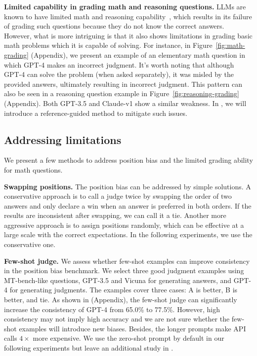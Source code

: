 \textbf{Limited capability in grading math and reasoning questions.}
LLMs are known to have limited math and reasoning capability~\cite{cobbe2021training}, which results in its failure of grading such questions because they do not know the correct answers.
However, what is more intriguing is that it also shows limitations in grading basic math problems which it is capable of solving.
For instance, in Figure~\ref{fig:math-grading} (Appendix), we present an example of an elementary math question in which GPT-4 makes an incorrect judgment.
It's worth noting that although GPT-4 can solve the problem (when asked separately), it was misled by the provided answers, ultimately resulting in incorrect judgment.
This pattern can also be seen in a reasoning question example in Figure~\ref{fig:reasoning-grading} (Appendix).
Both GPT-3.5 and Claude-v1 show a similar weakness.
In , we will introduce a reference-guided method to mitigate such issues.

\subsection{Addressing limitations}
\label{sec:addressing_limitations}
We present a few methods to address position bias and the limited grading ability for math questions.


\textbf{Swapping positions.}
The position bias can be addressed by simple solutions.
A conservative approach is to call a judge twice by swapping the order of two answers and only declare a win when an answer is preferred in both orders. If the results are inconsistent after swapping, we can call it a tie.
Another more aggressive approach is to assign positions randomly, which can be effective at a large scale with the correct expectations. In the following experiments, we use the conservative one.


\textbf{Few-shot judge.}
We assess whether few-shot examples can improve consistency in the position bias benchmark. We select three good judgment examples using MT-bench-like questions, GPT-3.5 and Vicuna for generating answers, and GPT-4 for generating judgments. 
The examples cover three cases: A is better, B is better, and tie.
As shown in  (Appendix), the few-shot judge can significantly increase the consistency of GPT-4 from 65.0\% to 77.5\%.
However, high consistency may not imply high accuracy and we are not sure whether the few-shot examples will introduce new biases. Besides, the longer prompts make API calls $4 \times$ more expensive. We use the zero-shot prompt by default in our following experiments but leave an additional study in .

